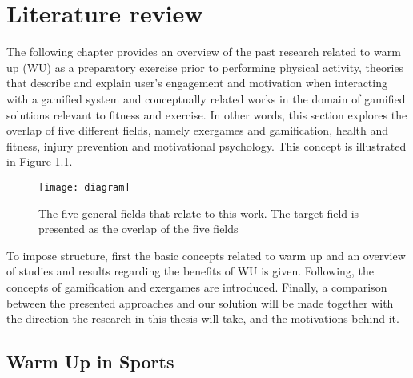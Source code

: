 \chapter{Literature review}\label{chapter:warmup}
The following chapter provides an overview of the past research related to warm up (WU) as a preparatory exercise prior to performing physical activity, theories that describe and explain user's engagement and motivation when interacting with a gamified system and conceptually related works in the domain of gamified solutions relevant to fitness and exercise. In other words, this section explores the overlap of five different fields, namely exergames and gamification, health and fitness, injury prevention and motivational psychology. This concept is illustrated in Figure \ref{fig:diagram}.
\begin{figure}[h]
    \centering
    \texttt{[image: diagram]}
    \caption{The five general fields that relate to this work. The target field is presented as the overlap of the five fields}
    \label{fig:diagram}
\end{figure}
To impose structure, first the basic concepts related to warm up and an overview of studies and results regarding the benefits of WU is given. Following, the concepts of gamification and exergames are introduced. Finally, a comparison between the presented approaches and our solution will be made together with the direction the
research in this thesis will take, and the motivations behind it.
\section{Warm Up in Sports}
